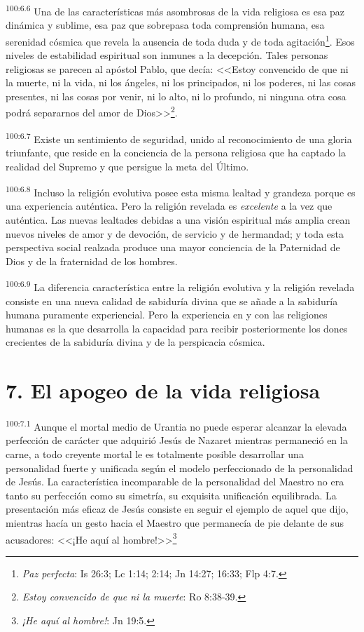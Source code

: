 \par
\textsuperscript{100:6.6} Una de las características más asombrosas de la vida religiosa es esa paz dinámica y sublime, esa paz que sobrepasa toda comprensión humana, esa serenidad cósmica que revela la ausencia de toda duda y de toda agitación\footnote{\textit{Paz perfecta}: Is 26:3; Lc 1:14; 2:14; Jn 14:27; 16:33; Flp 4:7.}. Esos niveles de estabilidad espiritual son inmunes a la decepción. Tales personas religiosas se parecen al apóstol Pablo, que decía: <<Estoy convencido de que ni la muerte, ni la vida, ni los ángeles, ni los principados, ni los poderes, ni las cosas presentes, ni las cosas por venir, ni lo alto, ni lo profundo, ni ninguna otra cosa podrá separarnos del amor de Dios>>\footnote{\textit{Estoy convencido de que ni la muerte}: Ro 8:38-39.}.

\par
\textsuperscript{100:6.7} Existe un sentimiento de seguridad, unido al reconocimiento de una gloria triunfante, que reside en la conciencia de la persona religiosa que ha captado la realidad del Supremo y que persigue la meta del Último.

\par
\textsuperscript{100:6.8} Incluso la religión evolutiva posee esta misma lealtad y grandeza porque es una experiencia auténtica. Pero la religión revelada es \textit{excelente} a la vez que auténtica. Las nuevas lealtades debidas a una visión espiritual más amplia crean nuevos niveles de amor y de devoción, de servicio y de hermandad; y toda esta perspectiva social realzada produce una mayor conciencia de la Paternidad de Dios y de la fraternidad de los hombres.

\par
\textsuperscript{100:6.9} La diferencia característica entre la religión evolutiva y la religión revelada consiste en una nueva calidad de sabiduría divina que se añade a la sabiduría humana puramente experiencial. Pero la experiencia en y con las religiones humanas es la que desarrolla la capacidad para recibir posteriormente los dones crecientes de la sabiduría divina y de la perspicacia cósmica.

\section*{7. El apogeo de la vida religiosa}
\par
\textsuperscript{100:7.1} Aunque el mortal medio de Urantia no puede esperar alcanzar la elevada perfección de carácter que adquirió Jesús de Nazaret mientras permaneció en la carne, a todo creyente mortal le es totalmente posible desarrollar una personalidad fuerte y unificada según el modelo perfeccionado de la personalidad de Jesús. La característica incomparable de la personalidad del Maestro no era tanto su perfección como su simetría, su exquisita unificación equilibrada. La presentación más eficaz de Jesús consiste en seguir el ejemplo de aquel que dijo, mientras hacía un gesto hacia el Maestro que permanecía de pie delante de sus acusadores: <<¡He aquí al hombre!>>\footnote{\textit{¡He aquí al hombre!}: Jn 19:5.}

